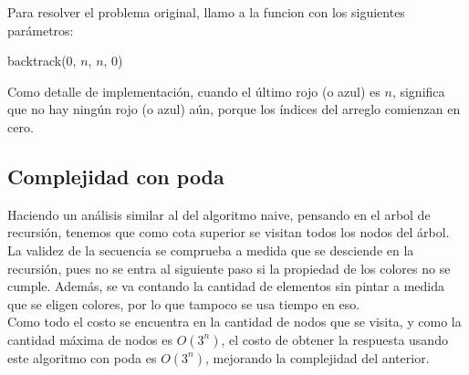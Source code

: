 Para resolver el problema original, llamo a la funcion con los siguientes parámetros:

\begin{algorithm}
\begin{algorithmic}
  \State backtrack($0$, $n$, $n$, $0$)
\EndProcedure
\end{algorithmic}
\end{algorithm}

Como detalle de implementación, cuando el último rojo (o azul) es $n$, significa que no hay ningún rojo (o azul) aún, porque los índices del arreglo comienzan en cero.

\subsection{Complejidad con poda}

Haciendo un análisis similar al del algoritmo naive, pensando en el arbol de recursión, tenemos que como cota superior se visitan todos los nodos del árbol. La validez de la secuencia se comprueba a medida que se desciende en la recursión, pues no se entra al siguiente paso si la propiedad de los colores no se cumple. Además, se va contando la cantidad de elementos sin pintar a medida que se eligen colores, por lo que tampoco se usa tiempo en eso. \\

Como todo el costo se encuentra en la cantidad de nodos que se visita, y como la cantidad máxima de nodos es $O(3^{n})$, el costo de obtener la respuesta usando este algoritmo con poda es $O(3^n)$, mejorando la complejidad del anterior.
